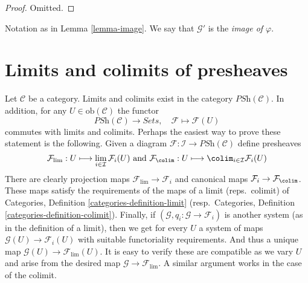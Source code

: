 \begin{proof}
Omitted.
\end{proof}

\begin{definition}
\label{definition-image}
Notation as in Lemma \ref{lemma-image}. We
say that $\mathcal{G}'$ is the {\it image of $\varphi$}.
\end{definition}
















\section{Limits and colimits of presheaves}
\label{section-limits-colimits-PSh}

\noindent
Let $\mathcal{C}$ be a category.
Limits and colimits exist in the category
$\textit{PSh}(\mathcal{C})$. In addition, for any
$U \in \text{ob}(\mathcal{C})$ the functor
$$
\textit{PSh}(\mathcal{C})
\longrightarrow
\textit{Sets}, \quad
\mathcal{F}
\longmapsto
\mathcal{F}(U)
$$
commutes with limits and colimits. Perhaps the easiest way to prove
these statement is the following. Given a diagram
$
\mathcal{F} :
\mathcal{I}
\to
\textit{PSh}(\mathcal{C})
$
define presheaves
$$
\mathcal{F}_{\lim} :
U
\longmapsto
\lim_{i \in \mathcal{I}} \mathcal{F}_i(U)
\text{  and  }
\mathcal{F}_{\colim} :
U
\longmapsto
\colim_{i \in \mathcal{I}} \mathcal{F}_i(U)
$$
There are clearly projection maps $\mathcal{F}_{\lim} \to \mathcal{F}_i$
and canonical maps $\mathcal{F}_i \to \mathcal{F}_{\colim}$. These
maps satisfy the requirements of the maps of a limit (reps.\ colimit)
of Categories, Definition \ref{categories-definition-limit}
(resp.\ Categories, Definition \ref{categories-definition-colimit}).
Finally, if $(\mathcal{G}, q_i : \mathcal{G} \to \mathcal{F}_i)$ is another
system (as in the definition of a limit), then we get for every
$U$ a system of maps $\mathcal{G}(U) \to \mathcal{F}_i(U)$
with suitable functoriality requirements. And thus a unique
map $\mathcal{G}(U) \to \mathcal{F}_{\lim}(U)$. It is easy
to verify these are compatible  as we vary $U$ and arise from
the desired map $\mathcal{G} \to \mathcal{F}_{\lim}$.
A similar argument works in the case of the colimit.





















